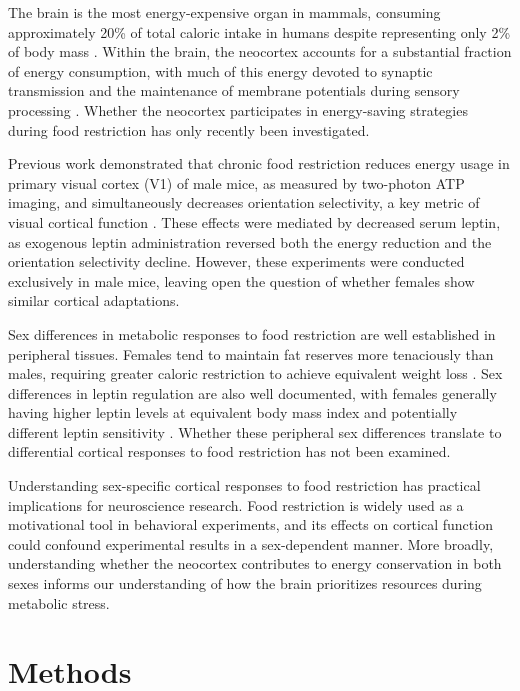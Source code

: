\documentclass[11pt]{article}
\begin{document}
The brain is the most energy-expensive organ in mammals, consuming approximately 20\% of total caloric intake in humans despite representing only 2\% of body mass \citep{harris2012}. Within the brain, the neocortex accounts for a substantial fraction of energy consumption, with much of this energy devoted to synaptic transmission and the maintenance of membrane potentials during sensory processing \citep{attwell2001}. Whether the neocortex participates in energy-saving strategies during food restriction has only recently been investigated.

Previous work demonstrated that chronic food restriction reduces energy usage in primary visual cortex (V1) of male mice, as measured by two-photon ATP imaging, and simultaneously decreases orientation selectivity, a key metric of visual cortical function \citep{padamsey2022}. These effects were mediated by decreased serum leptin, as exogenous leptin administration reversed both the energy reduction and the orientation selectivity decline. However, these experiments were conducted exclusively in male mice, leaving open the question of whether females show similar cortical adaptations.

Sex differences in metabolic responses to food restriction are well established in peripheral tissues. Females tend to maintain fat reserves more tenaciously than males, requiring greater caloric restriction to achieve equivalent weight loss \citep{valle2005}. Sex differences in leptin regulation are also well documented, with females generally having higher leptin levels at equivalent body mass index and potentially different leptin sensitivity \citep{rosenbaum2005}. Whether these peripheral sex differences translate to differential cortical responses to food restriction has not been examined.

Understanding sex-specific cortical responses to food restriction has practical implications for neuroscience research. Food restriction is widely used as a motivational tool in behavioral experiments, and its effects on cortical function could confound experimental results in a sex-dependent manner. More broadly, understanding whether the neocortex contributes to energy conservation in both sexes informs our understanding of how the brain prioritizes resources during metabolic stress.

\section{Methods}
\end{document}
